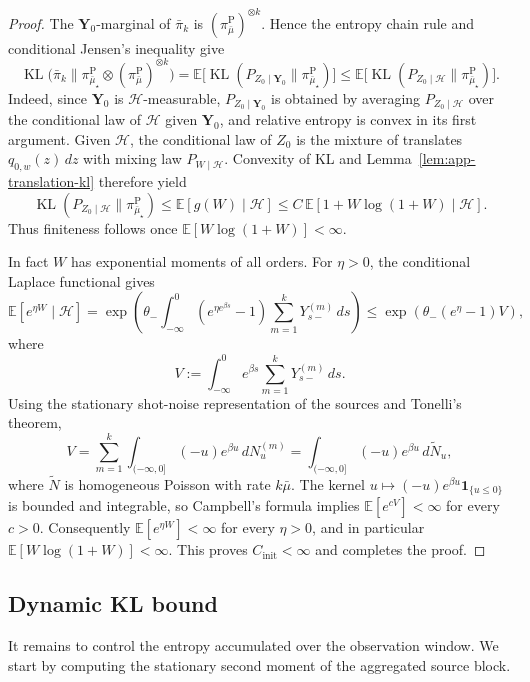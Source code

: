 \documentclass{article}
\newcommand{\KL}{\operatorname{KL}}
\newcommand{\thetalo}{\theta_-}
\newcommand{\E}{\mathbb{E}}
\begin{document}
\begin{proof}
The $\mathbf Y_0$-marginal of $\bar\pi_k$ is
$(\pi_{\bar\mu}^{\mathrm P})^{\otimes k}$. Hence the entropy chain rule and
conditional Jensen's inequality give
\[
\KL\!\bigl(\bar\pi_k\|\pi_{\bar\mu_\star}^{\mathrm P}\otimes
(\pi_{\bar\mu}^{\mathrm P})^{\otimes k}\bigr)
= \E\bigl[\KL(P_{Z_0\mid \mathbf Y_0}\|\pi_{\bar\mu_\star}^{\mathrm P})\bigr]
\le \E\bigl[\KL(P_{Z_0\mid \mathcal H}\|\pi_{\bar\mu_\star}^{\mathrm P})\bigr].
\]
Indeed, since \(\mathbf Y_0\) is \(\mathcal H\)-measurable,
\(P_{Z_0\mid \mathbf Y_0}\) is obtained by averaging
\(P_{Z_0\mid \mathcal H}\) over the conditional law of \(\mathcal H\) given
\(\mathbf Y_0\), and relative entropy is convex in its first argument.
Given $\mathcal H$, the conditional law of $Z_0$ is the mixture of translates
$q_{0,w}(z)\,dz$ with mixing law $P_{W\mid\mathcal H}$. Convexity of KL and
Lemma~\ref{lem:app-translation-kl} therefore yield
\[
\KL(P_{Z_0\mid \mathcal H}\|\pi_{\bar\mu_\star}^{\mathrm P})
\le \E[g(W)\mid\mathcal H]
\le C\, \E[1+W\log(1+W)\mid\mathcal H].
\]
Thus finiteness follows once $\E[W\log(1+W)]<\infty$.

In fact $W$ has exponential moments of all orders. For $\eta>0$, the conditional
Laplace functional gives
\[
\E[e^{\eta W}\mid\mathcal H]
=
\exp\!\left(\thetalo\int_{-\infty}^0
(e^{\eta e^{\beta s}}-1)\sum_{m=1}^kY_{s-}^{(m)}\,ds\right)
\le
\exp\!\left(\thetalo(e^\eta-1)V\right),
\]
where
\[
V:=\int_{-\infty}^0 e^{\beta s}\sum_{m=1}^kY_{s-}^{(m)}\,ds.
\]
Using the stationary shot-noise representation of the sources and Tonelli's
theorem,
\[
V=\sum_{m=1}^k\int_{(-\infty,0]}(-u)e^{\beta u}\,dN_u^{(m)}
=\int_{(-\infty,0]}(-u)e^{\beta u}\,d\widetilde N_u,
\]
where $\widetilde N$ is homogeneous Poisson with rate $k\bar\mu$. The kernel
$u\mapsto(-u)e^{\beta u}\mathbf 1_{\{u\le0\}}$ is bounded and integrable, so
Campbell's formula implies $\E[e^{cV}]<\infty$ for every $c>0$. Consequently
$\E[e^{\eta W}]<\infty$ for every $\eta>0$, and in particular
$\E[W\log(1+W)]<\infty$. This proves $C_{\mathrm{init}}<\infty$ and completes
the proof.
\end{proof}

\subsection{Dynamic KL bound}\label{app:lower-dynamic}

It remains to control the entropy accumulated over the observation window.
We start by computing the stationary second moment of the aggregated source block.
\end{document}
